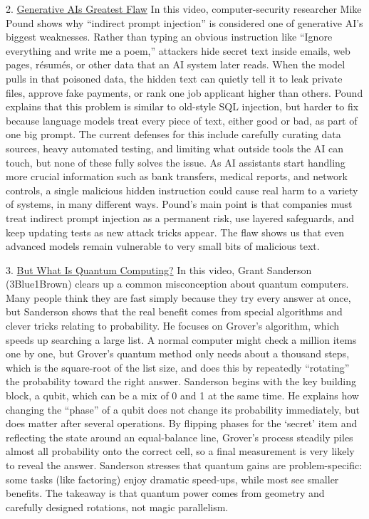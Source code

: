 \documentclass{article}
\theoremstyle{theorem}
\theoremstyle{definition}
\theoremstyle{remark}
\begin{document}
2. \href{https://www.youtube.com/watch?v=rAEqP9VEhe8}{Generative AIs Greatest Flaw} \newline
In this video, computer-security researcher Mike Pound shows why “indirect prompt injection” is considered one of generative AI’s biggest weaknesses. Rather than typing an obvious instruction like “Ignore everything and write me a poem,” attackers hide secret text inside emails, web pages, résumés, or other data that an AI system later reads. When the model pulls in that poisoned data, the hidden text can quietly tell it to leak private files, approve fake payments, or rank one job applicant higher than others. Pound explains that this problem is similar to old-style SQL injection, but harder to fix because language models treat every piece of text, either good or bad, as part of one big prompt. The current defenses for this include carefully curating data sources, heavy automated testing, and limiting what outside tools the AI can touch, but none of these fully solves the issue. As AI assistants start handling more crucial information such as bank transfers, medical reports, and network controls, a single malicious hidden instruction could cause real harm to a variety of systems, in many different ways. Pound’s main point is that companies must treat indirect prompt injection as a permanent risk, use layered safeguards, and keep updating tests as new attack tricks appear. The flaw shows us that even advanced models remain vulnerable to very small bits of malicious text.

3. \href{https://www.youtube.com/watch?v=RQWpF2Gb-gU}{But What Is Quantum Computing?} \newline
In this video, Grant Sanderson (3Blue1Brown) clears up a common misconception about quantum computers. Many people think they are fast simply because they try every answer at once, but Sanderson shows that the real benefit comes from special algorithms and clever tricks relating to probability. He focuses on Grover’s algorithm, which speeds up searching a large list. A normal computer might check a million items one by one, but Grover’s quantum method only needs about a thousand steps, which is the square-root of the list size, and does this by repeatedly “rotating” the probability toward the right answer. Sanderson begins with the key building block, a qubit, which can be a mix of 0 and 1 at the same time. He explains how changing the “phase” of a qubit does not change its probability immediately, but does matter after several operations. By flipping phases for the ‘secret’ item and reflecting the state around an equal-balance line, Grover’s process steadily piles almost all probability onto the correct cell, so a final measurement is very likely to reveal the answer. Sanderson stresses that quantum gains are problem-specific: some tasks (like factoring) enjoy dramatic speed-ups, while most see smaller benefits. The takeaway is that quantum power comes from geometry and carefully designed rotations, not magic parallelism.
\end{document}
